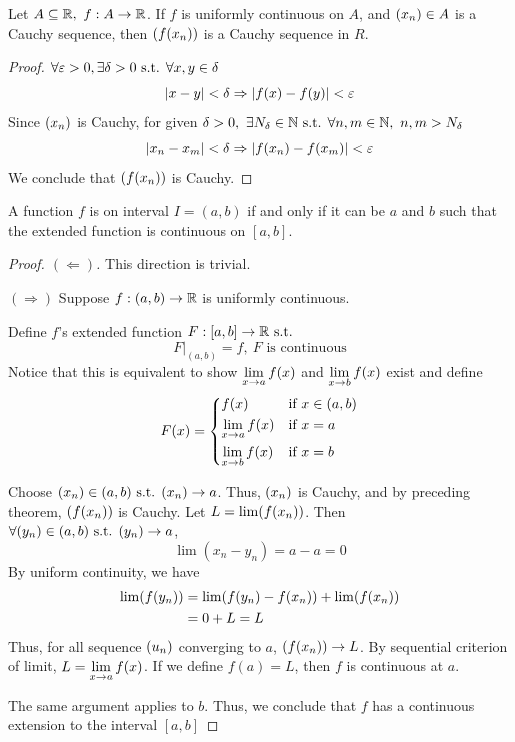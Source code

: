 \documentclass[a4paper,12pt]{article}
\begin{document}
\begin{theorem}
    Let \(A\subseteq\R,\ f:A\rightarrow\R\). If \(f\) is uniformly continuous on \(A\), and \((x _{n })\in A\) is a Cauchy sequence, 
    then \((f(x_{n}))\) is a Cauchy sequence in \(R\).
    \begin{proof}
        \(\forall \varepsilon>0, \exists \delta>0\text{ s.t. } \forall x,y\in \delta\)
        \[\left\lvert x-y\right\rvert<\delta\Rightarrow\left\lvert f(x)-f(y)\right\rvert<\varepsilon\]
        Since \((x _{n }) \) is Cauchy, for given \(\delta>0,\ \exists N_\delta\in\mathbb{N}\text{ s.t. } \forall n,m\in\mathbb{N},\ n,m>N_\delta\)
        \[\left\lvert x_n-x_m\right\rvert<\delta\Rightarrow\left\lvert f(x_n)-f(x_m)\right\rvert<\varepsilon\]
        We conclude that \((f(x _{n }))\) is Cauchy.
    \end{proof}
\end{theorem}
\newpage

\begin{theorem}
    A function \(f\) is  on  interval \(I=(a,b)\) if and only if 
    it can be  \(a\) and \(b\) 
    such that the extended function is continuous on \([a,b]\).
    \begin{proof}[Proof. \((\Leftarrow)\)] This direction is trivial.
        
        \((\Rightarrow)\) Suppose \(f:(a,b)\rightarrow\mathbb{R}\) is uniformly continuous.

         Define \(f\)'s extended function \(F:[a,b]\rightarrow\mathbb{R}\text{ s.t. }\) 
        \[F|_{(a,b)}=f,\ F \text{ is continuous}\] 
        Notice that this is equivalent to show \(\displaystyle\lim_{x\rightarrow a} {f(x)}\) and \(\displaystyle\lim_{x\rightarrow b} {f(x)}\) exist and define \[F(x)=\begin{cases*}
            f(x) & if \(x\in(a,b)\)\\
            \ds\limx{a}{f(x)}& if \(x=a\)\\
            \ds\limx{b}{f(x)}& if \(x=b\)
        \end{cases*}\]

        Choose \((x _{n })\in (a,b)\text{ s.t. } (x _{n })\rightarrow a\). Thus, \((x _{n })\) is Cauchy, and by preceding theorem, \((f(x _{n }))\) is Cauchy. 
        Let \(L=\lim(f(x_{n}))\). Then \(\forall (y_{n })\in(a,b)\text{ s.t. }(y_{n })\rightarrow a\),
        \[\lim(x_n-y_n)=a-a=0\]
        By uniform continuity, we have 
        \begin{align*}
            \lim(f(y _{n }))&=\lim(f(y _{n })-f(x _{n }))+\lim(f(x _{n }))\\
            &=0+L=L
        \end{align*}
        Thus, for all sequence \((u _{n })\) converging to \(a\), \((f(x _{n }))\rightarrow L\). By sequential criterion of limit, 
        \(\displaystyle L=\lim_{x\rightarrow a} {f(x)}\). If we define \(f(a)=L\), then \(f\) is continuous at \(a\).

        The same argument applies to \(b\). Thus, we conclude that \(f\) has a continuous extension to the interval \([a,b]\)
    \end{proof}
\end{theorem}
\end{document}
